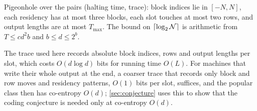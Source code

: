 \begin{outline}
Pigeonhole over the pairs (halting time, trace): block indices lie in $[-N,N]$, each residency has
at most three blocks, each slot touches at most two rows, and output lengths are at most
$T_{\max}$. The bound on $\lceil \log_2 \mathcal{N} \rceil$ is arithmetic from $T\le cd^2b$ and $b\le d\le2^b$.
\end{outline}

The trace used here records absolute block indices, rows and output lengths per slot, which costs
$O(d\log d)$ bits for running time $O(L)$. For machines that write their whole output at the end, a coarser
trace that records only block and row moves and residency patterns, $O(1)$ bits per slot, suffices, and the popular class then has co-entropy $O(d)$; \cref{sec:conjecture} uses this to show
that the coding conjecture is needed only at co-entropy $O(d)$.
